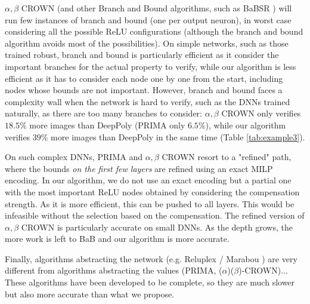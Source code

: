 $\alpha,\beta$ CROWN \cite{crown} (and other Branch and Bound algorithms, such as BaBSR \cite{BaB}) will run few instances of branch and bound (one per output neuron), in worst case considering all the possible ReLU configurations (although the branch and bound algorithm avoids most of the possibilities). On simple networks, such as those trained robust, branch and bound is  particularly efficient as it consider the important branches for the actual property to verify, while our algorithm is less efficient as it has to consider each node one by one from the start, including nodes whose bounds are not important. However, branch and bound faces a complexity wall when the network is hard to verify, such as the DNNs trained naturally, as there are too many branches to consider:
$\alpha,\beta$ CROWN only verifies $18.5\%$ more images than DeepPoly (PRIMA only $6.5\%$), while our algorithm verifies $39\%$ more images than DeepPoly in the same time (Table \ref{tab:example3}).

On such complex DNNs, PRIMA and $\alpha,\beta$ CROWN resort to a "refined" path, where the bounds {\em on the first few layers} are refined \cite{MILP2} using an exact MILP encoding. In our algorithm, we do not use an exact encoding but a partial one with the most important ReLU nodes obtained by considering the compensation strength. As it is more efficient, this can be pushed to all layers. This would be infeasible without the selection based on the compensation. The refined version of $\alpha,\beta$ CROWN is particularly accurate on small DNNs. As the depth grows, the more work is left to BaB and our algorithm is more accurate.

Finally, algorithms abstracting the network (e.g. Reluplex / Marabou \cite{Reluplex,katz2019marabou}) are very different from algorithms abstracting the values (PRIMA, ($\alpha$)($\beta$)-CROWN)\cite{prima,crown}$\ldots$ These algorithms have been developed to be complete, so they are much slower but also more accurate than what we propose.
